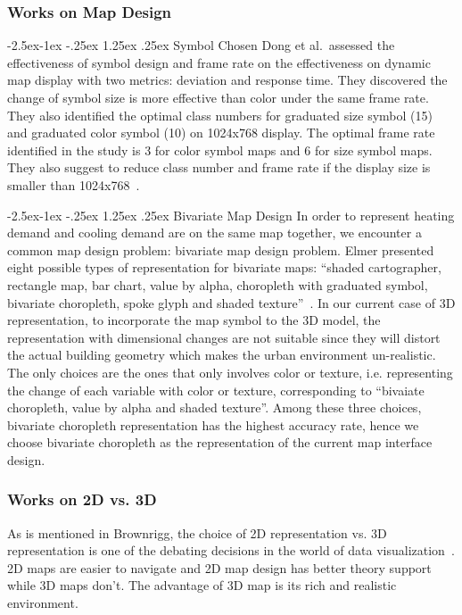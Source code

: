 \documentclass[hidelinks,12pt]{article}
\makeatletter
\renewcommand\paragraph{\@startsection{paragraph}{4}{\z@}%
            {-2.5ex\@plus -1ex \@minus -.25ex}%
            {1.25ex \@plus .25ex}%
            {\normalfont\normalsize\bfseries}}
\makeatother
\begin{document}
\subsubsection{Works on Map Design}\label{mapDesign}
\paragraph{Symbol Chosen}
Dong et al.\ assessed the effectiveness of symbol design and frame
rate on the effectiveness on dynamic map display with two metrics:
deviation and response time. They discovered the change of symbol size
is more effective than color under the same frame rate. They also
identified the optimal class numbers for graduated size symbol (15)
and graduated color symbol (10) on 1024x768 display. The optimal frame
rate identified in the study is 3 for color symbol maps and 6 for size
symbol maps. They also suggest to reduce class number and frame rate
if the display size is smaller than
1024x768~\cite{doi:10.1559/1523040639298}.

\paragraph{Bivariate Map Design} \label{bivariate}
In order to represent heating demand and cooling demand are on the
same map together, we encounter a common map design problem: bivariate
map design problem. Elmer presented eight possible types of
representation for bivariate maps: ``shaded cartographer, rectangle map,
bar chart, value by alpha, choropleth with graduated symbol, bivariate
choropleth, spoke glyph and shaded texture''~\cite{Elmer2012}. In our
current case of 3D representation, to incorporate the map symbol to
the 3D model, the representation with dimensional changes are not
suitable since they will distort the actual building geometry which
makes the urban environment un-realistic. The only choices are the
ones that only involves color or texture, i.e. representing the change
of each variable with color or texture, corresponding to ``bivaiate
choropleth, value by alpha and shaded texture''. Among these three
choices, bivariate choropleth representation has the highest accuracy
rate, hence we choose bivariate choropleth as the representation of
the current map interface design.

\subsubsection{Works on 2D vs. 3D} \label{2d3d} As is mentioned in
Brownrigg, the choice of 2D representation vs. 3D representation is
one of the debating decisions in the world of data
visualization~\cite{Brownrigg2005}. 2D maps are easier to navigate and
2D map design has better theory support while 3D maps don't. The
advantage of 3D map is its rich and realistic environment.
\end{document}
